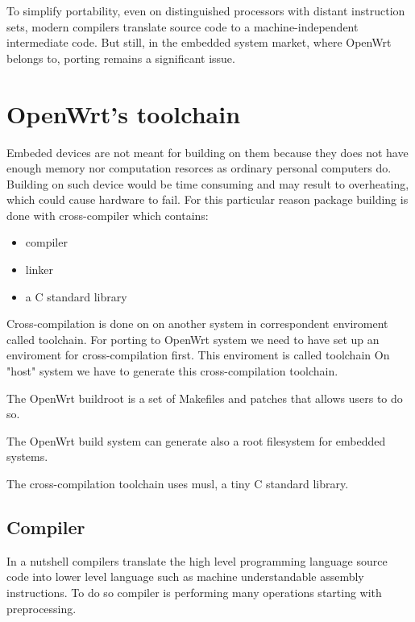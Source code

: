 To simplify portability, even on distinguished processors with distant instruction sets, modern compilers translate source code to a machine-independent intermediate code.
But still, in the embedded system market, where OpenWrt belongs to, porting remains a significant issue.

\section{OpenWrt's toolchain} %

Embeded devices are not meant for building on them because they does not have enough memory nor computation resorces as ordinary personal computers do.
Building on such device would be time consuming and may result to overheating, which could cause hardware to fail.
For this particular reason package building is done with cross-compiler which contains:

\begin{itemize}
    \item compiler
    \item linker
    \item a C standard library
\end{itemize}

Cross-compilation is done on  on another system in correspondent enviroment called toolchain.
For porting to OpenWrt system we need to have set up an enviroment for cross-compilation first.
This enviroment is called toolchain
On "host" system we have to generate this cross-compilation toolchain.

The OpenWrt buildroot is a set of Makefiles and patches that allows users to do so.

The OpenWrt build system can generate also a root filesystem for embedded systems.



The cross-compilation toolchain uses musl, a tiny C standard library.



\subsection{Compiler}

In a nutshell compilers translate the high level programming language source code into lower level language such as machine understandable assembly instructions.
To do so compiler is performing many operations starting with preprocessing.


